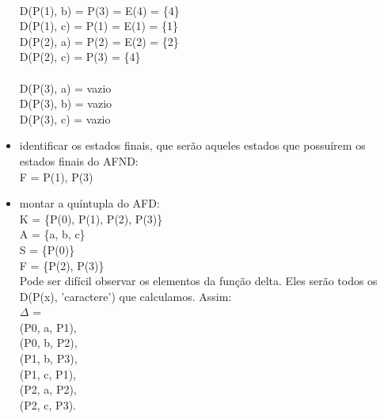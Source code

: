 \documentclass[a4paper,10pt]{article} %
\begin{document}
\begin{itemize}
            \\D(P(1), b) = P(3) = E(4) = \{4\}\\D(P(1), c) = P(1) = E(1) = \{1\}\\D(P(2), a) = P(2) = E(2) = \{2\}\\D(P(2), c) = P(3) = \{4\}\\
            \\D(P(3), a) = vazio\\D(P(3), b) = vazio\\D(P(3), c) = vazio
        \item identificar os estados finais, que serão aqueles estados que possuírem os estados finais do AFND:
            \\F = {P(1), P(3)}
        \item montar a quíntupla do AFD:
            \\K = \{P(0), P(1), P(2), P(3)\}\\A = \{a, b, c\}\\S = \{P(0)\}\\F = \{P(2), P(3)\}\\Pode ser difícil observar os elementos da função delta. Eles serão todos os D(P(x), 'caractere') que calculamos. Assim:\\{$\Delta$} =\\(P0, a, P1),\\(P0, b, P2),\\(P1, b, P3),\\(P1, c, P1),\\(P2, a, P2),\\(P2, c, P3).
    \end{itemize}
    \begin{center}
    \end{center}

\newpage
\end{document}

